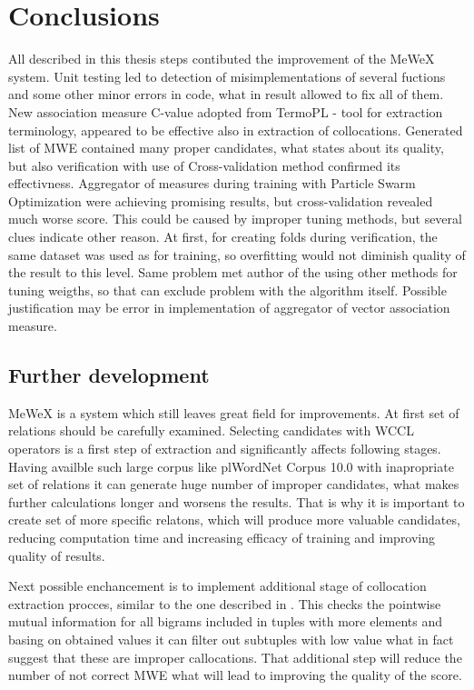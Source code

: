 \chapter{Conclusions}

All described in this thesis steps contibuted the improvement of the MeWeX system. Unit testing led to detection of 
misimplementations of several fuctions and some other minor errors in code, what in result allowed to fix all of them. 
New association measure C-value adopted from TermoPL \cite{termopl} - tool for extraction terminology, appeared to be effective also in extraction of collocations. 
Generated list of MWE contained many proper candidates, what states about its quality, but also verification with use of Cross-validation 
method confirmed its effectivness. Aggregator of measures during training with Particle Swarm Optimization were achieving promising results, 
but cross-validation revealed much worse score. This could be caused by improper tuning methods, but several clues indicate other reason. 
At first, for creating folds during verification, the same dataset was used as for training, so overfitting would not diminish quality of 
the result to this level. Same problem met author of the \cite{mgr} using other methods for tuning weigths, so that can exclude 
problem with the algorithm itself. Possible justification may be error in implementation of aggregator of vector association measure.

\section{Further development}
MeWeX is a system which still leaves great field for improvements. At first set of relations should be carefully examined. 
Selecting candidates with WCCL operators is a first step of extraction and significantly affects following stages. 
Having availble such large corpus like plWordNet Corpus 10.0 with inapropriate set of relations it can generate huge number of improper candidates, 
what makes further calculations longer and worsens the results. That is why it is important to create set of more specific relatons, 
which will produce more valuable candidates, reducing computation time and increasing efficacy of training and improving quality of results.

Next possible enchancement is to implement additional stage of collocation extraction procces, similar to the one described in \cite{termopl}.
This checks the pointwise mutual information for all bigrams included in tuples with more elements and basing on obtained values it can 
filter out subtuples with low value what in fact suggest that these are improper callocations. That additional step will reduce the number of 
not correct MWE what will lead to improving the quality of the score.

